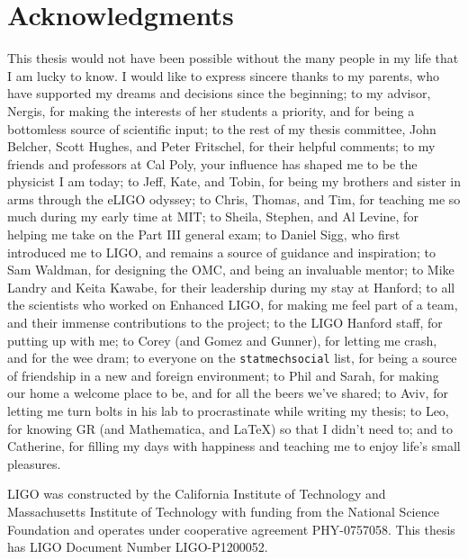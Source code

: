 % 

\cleardoublepage

\section*{Acknowledgments}

This thesis would not have been possible without the many people in my life that I am lucky to know. %
I would like to express sincere thanks 
to my parents, who have supported my dreams and decisions since the beginning;
to my advisor, Nergis, for making the interests of her students a priority, and for being a bottomless source of scientific input;
to the rest of my thesis committee, John Belcher, Scott Hughes, and Peter Fritschel, for their helpful comments;
to my friends and professors at Cal Poly, your influence has shaped me to be the physicist I am today;
to Jeff, Kate, and Tobin, for being my brothers and sister in arms through the eLIGO odyssey;
to Chris, Thomas, and Tim, for teaching me so much during my early time at MIT;
to Sheila, Stephen, and Al Levine, for helping me take on the Part III general exam;
to Daniel Sigg, who first introduced me to LIGO, and remains a source of guidance and inspiration;
to Sam Waldman, for designing the OMC, and being an invaluable mentor;
to Mike Landry and Keita Kawabe, for their leadership during my stay at Hanford;
to all the scientists who worked on Enhanced LIGO, for making me feel part of a team, and their immense contributions to the project;
to the LIGO Hanford staff, for putting up with me;
to Corey (and Gomez and Gunner), for letting me crash, and for the wee dram;
to everyone on the \texttt{statmechsocial} list, for being a source of friendship in a new and foreign environment;
to Phil and Sarah, for making our home a welcome place to be, and for all the beers we've shared;
to Aviv, for letting me turn bolts in his lab to procrastinate while writing my thesis;
to Leo, for knowing GR (and Mathematica, and \LaTeX{}) so that I didn't need to;
and to Catherine, for filling my days with happiness and teaching me to enjoy life's small pleasures.

LIGO was constructed by the California Institute of Technology and Massachusetts Institute of Technology with funding from the National Science Foundation and operates under cooperative agreement PHY-0757058. %
This thesis has LIGO Document Number LIGO-P1200052.

